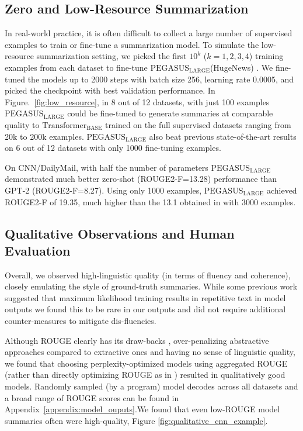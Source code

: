 \documentclass{article}
\newcommand\transformerbase{$\text{Transformer}_{\text{BASE}}$\xspace}
\newcommand\pegasuslarge{$\text{PEGASUS}_{\text{LARGE}}$\xspace}
\newcommand\gnews{HugeNews\xspace}
\begin{document}
\subsection{Zero and Low-Resource Summarization}
\label{sec:low_resource}
In real-world practice, it is often difficult to collect a large number of supervised examples to train or fine-tune a summarization model. To simulate the low-resource summarization setting, we picked the first $10^k$ ($k=1,2,3,4$) training examples from each dataset to fine-tune \pegasuslarge (\gnews) .
We fine-tuned the models up to 2000 steps with batch size 256, learning rate 0.0005, and picked the checkpoint with best validation performance.
In Figure.~\ref{fig:low_resource}, in 8 out of 12 datasets, with just 100 examples  \pegasuslarge could be fine-tuned to generate summaries at comparable quality to \transformerbase trained on the full supervised datasets ranging from 20k to 200k examples. 
\pegasuslarge also beat previous state-of-the-art results on 6 out of 12 datasets with only
1000 fine-tuning examples.

On CNN/DailyMail, 
with half the number of parameters
\pegasuslarge demonstrated much better zero-shot
(ROUGE2-F=13.28)
performance than GPT-2 (ROUGE2-F=8.27).
Using only 1000 examples, \pegasuslarge achieved ROUGE2-F of 19.35,
much higher than the 13.1 obtained in  
\citet{khandelwal2019sample}  with 3000 examples.

\subsection{Qualitative Observations and Human Evaluation}


Overall, we observed high-linguistic quality (in terms of fluency and coherence), closely emulating 
the style of ground-truth summaries.
While some previous work suggested that maximum likelihood training 
results in repetitive text in model outputs  \citep{welleck2019neural}
we found this to be rare in our outputs and did not require additional
counter-measures to mitigate dis-fluencies.


Although ROUGE clearly has its draw-backs \citep{kryscinski-etal-2019-neural},
over-penalizing abstractive approaches compared to extractive ones and having
no sense of linguistic quality,
we found that 
choosing perplexity-optimized models using aggregated ROUGE (rather than directly 
optimizing ROUGE as in \citet{paulus2017deep}) resulted in qualitatively 
good models.
Randomly sampled  (by a program) model decodes across all datasets and a broad range of
ROUGE scores can be found in Appendix~\ref{appendix:model_ouputs}.We found that even low-ROUGE model summaries often were high-quality, Figure \ref{fig:qualitative_cnn_example}.
\end{document}
